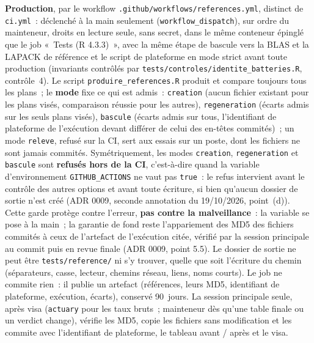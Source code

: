 \documentclass[a4paper,11pt]{article}
\newcommand{\code}[1]{\texttt{\small #1}}
\begin{document}
\medskip
\textbf{Production}, par le workflow \code{.github/workflows/references.yml},
distinct de \code{ci.yml}~: déclenché à la main seulement
(\code{workflow\_dispatch}), sur ordre du mainteneur, droits en lecture
seule, sans secret, dans le même conteneur épinglé que le job «~Tests
(R 4.3.3)~», avec la même étape de bascule vers la BLAS et la LAPACK de
référence et le script de plateforme en mode strict avant toute production
(invariants contrôlés par \code{tests/controles/identite\_batteries.R},
contrôle~4). Le script \code{produire\_references.R} produit et compare
toujours tous les plans~; le \textbf{mode} fixe ce qui est admis~:
\code{creation} (aucun fichier existant pour les plans visés, comparaison
réussie pour les autres), \code{regeneration} (écarts admis sur les seuls
plans visés), \code{bascule} (écarts admis sur tous, l'identifiant de
plateforme de l'exécution devant différer de celui des en-têtes commités)~;
un mode \code{releve}, refusé sur la CI, sert aux essais sur un poste, dont
les fichiers ne sont jamais commités. Symétriquement, les modes
\code{creation}, \code{regeneration} et \code{bascule} sont \textbf{refusés
hors de la CI}, c'est-à-dire quand la variable d'environnement
\code{GITHUB\_ACTIONS} ne vaut pas \code{true}~: le refus intervient avant
le contrôle des autres options et avant toute écriture, si bien qu'aucun
dossier de sortie n'est créé (ADR 0009, seconde annotation du 19/10/2026,
point~(d)). Cette garde protège contre l'erreur, \textbf{pas contre la
malveillance}~: la variable se pose à la main~; la garantie de fond reste
l'appariement des MD5 des fichiers commités à ceux de l'artefact de
l'exécution citée, vérifié par la session principale au commit puis en revue
finale (ADR 0009, point 5.5). Le dossier de sortie ne peut être
\code{tests/reference/} ni s'y trouver, quelle que soit l'écriture du chemin
(séparateurs, casse, lecteur, chemins réseau, liens, noms courts).
Le job ne commite rien~: il publie un artefact (références, leurs MD5,
identifiant de plateforme, exécution, écarts), conservé 90~jours. La session
principale seule, après visa (\code{actuary} pour les taux bruts~;
mainteneur dès qu'une table finale ou un verdict change), vérifie les MD5,
copie les fichiers sans modification et les commite avec l'identifiant de
plateforme, le tableau avant / après et le visa.
\end{document}
